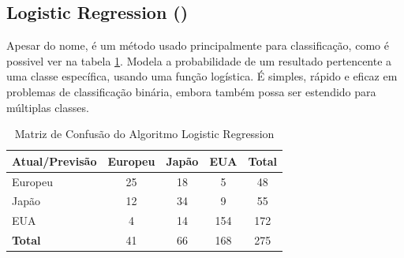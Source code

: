 \documentclass[conference]{IEEEtran}
\begin{document}
\subsection{Logistic Regression (\cite{regression})}
Apesar do nome, é um método usado principalmente para classificação, como é possivel ver na tabela \ref{tab:conf_matrix_logistic}.
Modela a probabilidade de um resultado pertencente a uma classe específica, usando uma função logística. É simples, rápido e eficaz
em problemas de classificação binária, embora também possa ser estendido para múltiplas classes.
\begin{table}[!ht]
	\centering
	\begin{tabular}{lcccc}
		\toprule
		\textbf{Atual/Previsão} & \textbf{Europeu} & \textbf{Japão} & \textbf{EUA} & \textbf{Total} \\
		\midrule
		Europeu                 & 25               & 18             & 5            & 48             \\
		Japão                   & 12               & 34             & 9            & 55             \\
		EUA                     & 4                & 14             & 154          & 172            \\
		\midrule
		\textbf{Total}          & 41               & 66             & 168          & 275            \\
		\bottomrule
	\end{tabular}
	\caption{Matriz de Confusão do Algoritmo Logistic Regression}
	\label{tab:conf_matrix_logistic}

\end{table}

\end{document}
